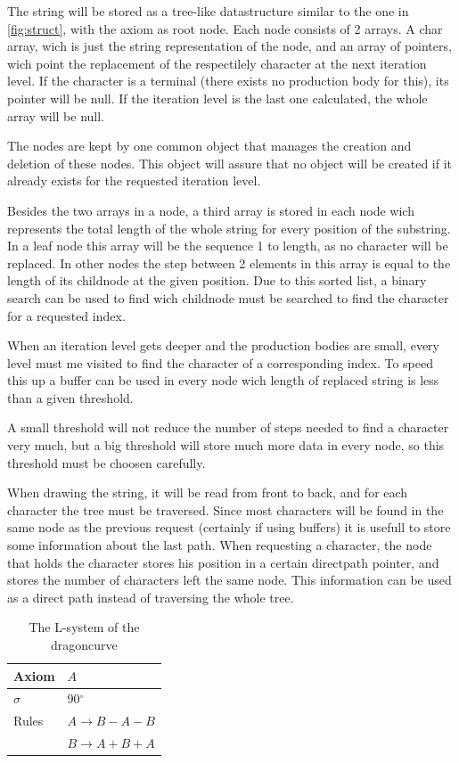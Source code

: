 \documentclass[11pt,a4paper]{article}
\newcommand{\degree}{\ensuremath{^\circ}}
\begin{document}
The string will be stored as a tree-like datastructure similar to the one in \ref{fig:struct}, with the axiom as root node. Each node consists of 2 arrays. A char array, wich is just the string representation of the node, and an array of pointers, wich point the replacement of the respectilely character at the next iteration level. If the character is a terminal (there exists no production body for this), its pointer will be null. If the iteration level is the last one calculated, the whole array will be null.

The nodes are kept by one common object that manages the creation and deletion of these nodes. This object will assure that no object will be created if it already exists for the requested iteration level.

Besides the two arrays in a node, a third array is stored in each node wich represents the total length of the whole string for every position of the substring. In a leaf node this array will be the sequence 1 to length, as no character will be replaced. In other nodes the step between 2 elements in this array is equal to the length of its childnode at the given position. Due to this sorted list, a binary search can be used to find wich childnode must be searched to find the character for a requested index.

When an iteration level gets deeper and the production bodies are small, every level must me visited to find the character of a corresponding index. To speed this up a buffer can be used in every node wich length of replaced string is less than a given threshold.

A small threshold will not reduce the number of steps needed to find a character very much, but a big threshold will store much more data in every node, so this threshold must be choosen carefully.

When drawing the string, it will be read from front to back, and for each character the tree must be traversed. Since most characters will be found in the same node as the previous request (certainly if using buffers) it is usefull to store some information about the last path. When requesting a character, the node that holds the character stores his position in a certain directpath pointer, and stores the number of characters left the same node. This information can be used as a direct path instead of traversing the whole tree.

\begin{table}
\center
\begin{tabular}{l l}
Axiom & $A$ \\ \hline
$\sigma$ & 90\degree \\ \hline
Rules & $A \rightarrow B-A-B$ \\
      & $B \rightarrow A+B+A$ \\
\end{tabular}
\caption{The L-system of the dragoncurve}
\end{table}
\end{document}

